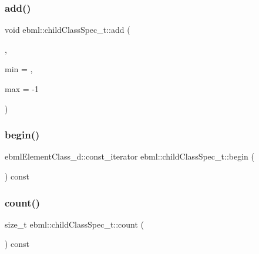 \subsubsection{\texorpdfstring{add()}{add()}\hspace{0.1cm}{\footnotesize\ttfamily [2/2]}}
{\footnotesize\ttfamily void ebml\+::child\+Class\+Spec\+\_\+t\+::add (\begin{DoxyParamCaption}\item[{const \mbox{\hyperlink{classebml_1_1ebmlElementClass}{ebml\+Element\+Class}} $\ast$}]{,  }\item[{unsigned long}]{min = {},  }\item[{long}]{max = {\ttfamily -\/1} }\end{DoxyParamCaption})}

\mbox{\label{classebml_1_1childClassSpec__t_a2d2e39e076f0801465d1a72f227bdd59}} 
\subsubsection{\texorpdfstring{begin()}{begin()}}
{\footnotesize\ttfamily ebml\+Element\+Class\+\_\+d\+::const\+\_\+iterator ebml\+::child\+Class\+Spec\+\_\+t\+::begin (\begin{DoxyParamCaption}{ }\end{DoxyParamCaption}) const}

\mbox{\label{classebml_1_1childClassSpec__t_a9a55992a46e3da6d3e637c2dc32c8226}} 
\subsubsection{\texorpdfstring{count()}{count()}\hspace{0.1cm}{\footnotesize\ttfamily [1/2]}}
{\footnotesize\ttfamily size\+\_\+t ebml\+::child\+Class\+Spec\+\_\+t\+::count (\begin{DoxyParamCaption}\item[{\mbox{\hyperlink{namespaceebml_a86c5f604ddf12a74aa9812e997a58691}{ebml\+I\+D\+\_\+t}}}]{ }\end{DoxyParamCaption}) const}

